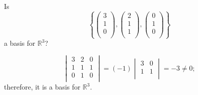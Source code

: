 \begin{example}
    Is 
    \[
        \left\{
            \begin{pmatrix}
                3 \\ 1 \\ 0 \\
            \end{pmatrix}
            ,
            \begin{pmatrix}
                2 \\ 1 \\ 1 \\
            \end{pmatrix}
            ,
            \begin{pmatrix}
                0 \\ 1 \\ 0 \\
            \end{pmatrix}
        \right\}
    \]
    a basis for $\mathbb{R}^3$?
    
    \[
        \begin{vmatrix}
            3 & 2 & 0 \\
            1 & 1 & 1 \\
            0 & 1 & 0 \\
        \end{vmatrix}
        = (-1)
        \begin{vmatrix}
            3 & 0 \\
            1 & 1 \\
        \end{vmatrix}
        = -3 \neq 0;
    \]
    therefore, it is a basis for $\mathbb{R}^3$.
\end{example}

